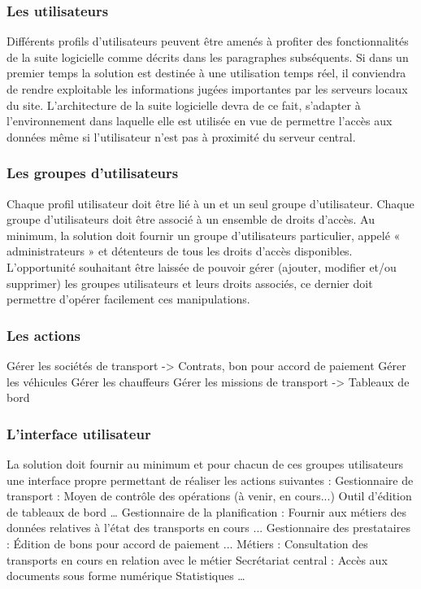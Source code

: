 \documentclass[11pt,fleqn]{book} %
\begin{document}
\subsubsection{Les utilisateurs}
Différents profils d'utilisateurs peuvent être amenés à profiter des fonctionnalités de la suite logicielle comme décrits dans les paragraphes subséquents. 
Si dans un premier temps la solution est destinée à une utilisation temps réel, il conviendra de rendre exploitable les informations jugées importantes par les serveurs locaux du site.
L'architecture de la suite logicielle devra de ce fait, s'adapter à l'environnement dans laquelle elle est utilisée en vue de permettre l'accès aux données même si l'utilisateur n'est pas à proximité du serveur central.

\subsubsection{Les groupes d'utilisateurs}
Chaque profil utilisateur doit être lié à un et un seul groupe d'utilisateur.
Chaque groupe d'utilisateurs doit être associé à un ensemble de droits d'accès.
Au minimum, la solution doit fournir un groupe d'utilisateurs particulier, appelé « administrateurs » et détenteurs de tous les droits d'accès disponibles. L'opportunité souhaitant être laissée de pouvoir gérer (ajouter, modifier et/ou supprimer) les groupes utilisateurs et leurs droits associés, ce dernier doit permettre d'opérer facilement ces manipulations.

\subsubsection{Les actions}
Gérer les sociétés de transport -> Contrats, bon pour accord de paiement
Gérer les véhicules
Gérer les chauffeurs
Gérer les missions de transport -> Tableaux de bord

\subsubsection{L'interface utilisateur}
La solution doit fournir au minimum et pour chacun de ces groupes utilisateurs une interface propre permettant de réaliser les actions suivantes :
Gestionnaire de transport :
Moyen de contrôle des opérations (à venir, en cours...)
Outil d'édition de tableaux de bord
…
Gestionnaire de la planification :
Fournir aux métiers des données relatives à l'état des transports en cours
...
Gestionnaire des prestataires :
Édition de bons pour accord de paiement
...
Métiers :
Consultation des transports en cours en relation avec le métier
Secrétariat central :
Accès aux documents sous forme numérique
Statistiques
…
\end{document}

